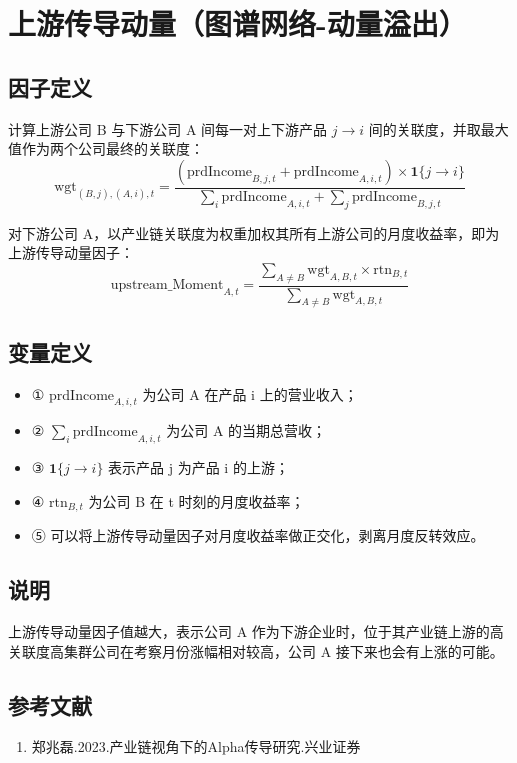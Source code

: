 \documentclass{article}
\begin{document}
\section{上游传导动量（图谱网络-动量溢出）}

\subsection{因子定义}
计算上游公司 B 与下游公司 A 间每一对上下游产品 \( j \to i \) 间的关联度，并取最大值作为两个公司最终的关联度：
\begin{equation}
    \mathrm{wgt}_{(B,j),(A,i),t} = \frac{(\mathrm{prdIncome}_{B,j,t} + \mathrm{prdIncome}_{A,i,t}) \times \mathbf{1}\{j \to i\}}{\sum_i \mathrm{prdIncome}_{A,i,t} + \sum_j \mathrm{prdIncome}_{B,j,t}}
\end{equation}

对下游公司 A，以产业链关联度为权重加权其所有上游公司的月度收益率，即为上游传导动量因子：
\begin{equation}
    \mathrm{upstream\_Moment}_{A,t} = \frac{\sum_{A \neq B} \mathrm{wgt}_{A,B,t} \times \mathrm{rtn}_{B,t}}{\sum_{A \neq B} \mathrm{wgt}_{A,B,t}}
\end{equation}

\subsection{变量定义}
\begin{itemize}
    \item ① \( \mathrm{prdIncome}_{A,i,t} \) 为公司 A 在产品 i 上的营业收入；
    \item ② \( \sum_i \mathrm{prdIncome}_{A,i,t} \) 为公司 A 的当期总营收；
    \item ③ \( \mathbf{1}\{j \to i\} \) 表示产品 j 为产品 i 的上游；
    \item ④ \( \mathrm{rtn}_{B,t} \) 为公司 B 在 t 时刻的月度收益率；
    \item ⑤ 可以将上游传导动量因子对月度收益率做正交化，剥离月度反转效应。
\end{itemize}

\subsection{说明}
上游传导动量因子值越大，表示公司 A 作为下游企业时，位于其产业链上游的高关联度高集群公司在考察月份涨幅相对较高，公司 A 接下来也会有上涨的可能。

\subsection{参考文献}
\begin{enumerate}
    \item 郑兆磊.2023.产业链视角下的Alpha传导研究.兴业证券
\end{enumerate}
\end{document}
